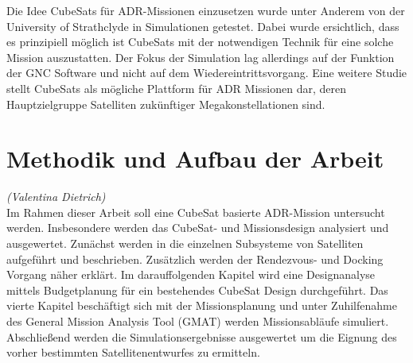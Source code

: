 Die Idee CubeSats für ADR-Missionen einzusetzen wurde unter Anderem von der University of Strathclyde in Simulationen getestet. Dabei wurde ersichtlich, dass es prinzipiell möglich ist CubeSats mit der notwendigen Technik für eine solche Mission auszustatten. Der Fokus der Simulation lag allerdings auf der Funktion der GNC Software und nicht auf dem Wiedereintrittsvorgang\cite{Pirat.2017}. Eine weitere Studie stellt CubeSats als mögliche Plattform für ADR Missionen dar, deren Hauptzielgruppe Satelliten zukünftiger Megakonstellationen sind\cite{BenLarbi.2017}.


	\section{Methodik und Aufbau der Arbeit}
		\hfill\emph{(Valentina Dietrich)}\\	
Im Rahmen dieser Arbeit soll eine  CubeSat basierte ADR-Mission untersucht werden. Insbesondere werden das CubeSat- und Missionsdesign analysiert und ausgewertet. Zunächst werden in  die einzelnen Subsysteme von Satelliten aufgeführt und beschrieben. Zusätzlich werden der Rendezvous- und Docking Vorgang näher erklärt. Im darauffolgenden Kapitel wird eine Designanalyse mittels Budgetplanung für ein bestehendes CubeSat Design durchgeführt.  Das vierte Kapitel beschäftigt sich mit der Missionsplanung und unter Zuhilfenahme des General Mission Analysis Tool (GMAT) werden Missionsabläufe simuliert. Abschließend werden die Simulationsergebnisse ausgewertet um die Eignung des vorher bestimmten Satellitenentwurfes zu ermitteln.

